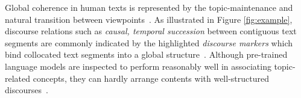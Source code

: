 \documentclass[11pt]{article}
\begin{document}
Global coherence in human texts is represented by the topic-maintenance and natural transition between viewpoints~\citep{speech_DanJurafsky}. As illustrated in Figure \ref{fig:example}, discourse relations such as \textit{causal, temporal succession} between contiguous text segments are commonly indicated by the highlighted \textit{discourse markers} which bind collocated text segments into a global structure~\citep{Hobbs1985OnTC}.
Although pre-trained language models are inspected to perform reasonably well in associating topic-related concepts, they can hardly arrange contents with well-structured discourses~\citep{See,ko-li-2020-assessing}.%




\end{document}
